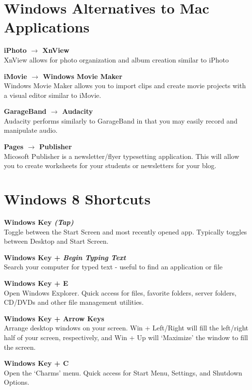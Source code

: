 \documentclass[10pt,foldmark,notumble]{leaflet}
\begin{document}

\section{Windows Alternatives to Mac Applications\color{red}\hrulefill\color{black}}
\textbf{iPhoto $\to$ XnView}\\
XnView allows for photo organization and album creation similar to iPhoto

\textbf{iMovie $\to$ Windows Movie Maker}\\
Windows Movie Maker allows you to import clips and create movie projects with a visual editor similar to iMovie.

\textbf{GarageBand $\to$ Audacity}\\
Audacity performs similarly to GarageBand in that you may easily record and manipulate audio. 

\textbf{Pages $\to$ Publisher}\\
Micosoft Publisher is a newsletter/flyer typesetting application. This will allow you to create worksheets for your students or newsletters for your blog.

\section{Windows 8 Shortcuts\color{red}\hrulefill\color{black}}
\textbf{Windows Key \emph{(Tap)}}\\
Toggle between the Start Screen and most recently opened app. Typically toggles between Desktop and Start Screen.

\textbf{Windows Key + \emph{Begin Typing Text}}\\
Search your computer for typed text - useful to find an application or file

\textbf{Windows Key + E}\\
Open Windows Explorer. Quick access for files, favorite folders, server folders, CD/DVDs and other file management utilities.

\textbf{Windows Key + Arrow Keys}\\
Arrange desktop windows on your screen. Win + Left/Right will fill the left/right half of your screen, respectively, and Win + Up will `Maximize' the window to fill the screen.

\textbf{Windows Key + C}\\
Open the `Charms' menu. Quick access for Start Menu, Settings, and Shutdown Options.
\end{document}
